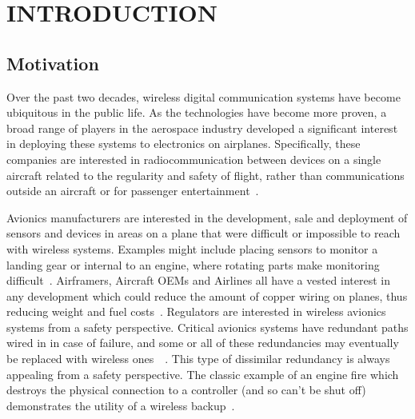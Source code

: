 %
%
%
%



\pagestyle{plain} %
\setcounter{page}{1}


\chapter{\uppercase {Introduction}}


\section{Motivation}

Over the past two decades, wireless digital communication systems have become ubiquitous in the public life. As the technologies have become more proven, a broad range of players in the aerospace industry developed a significant interest in deploying these systems to electronics on airplanes. Specifically, these companies are interested in radiocommunication between devices on a single aircraft related to the regularity and safety of flight, rather than communications outside an aircraft or for passenger entertainment~\cite{redman_waic_2011}. 

Avionics manufacturers are interested in the development, sale and deployment of sensors and devices in areas on a plane that were difficult or impossible to reach with wireless systems.  Examples might include placing sensors to monitor a landing gear or internal to an engine, where rotating parts make monitoring difficult~\cite{redman_waic_2011}. Airframers, Aircraft OEMs and Airlines all have a vested interest in any development which could reduce the amount of copper wiring on planes, thus reducing weight and fuel costs~\cite{canaday_war_2017}. Regulators are interested in wireless avionics systems from a safety perspective. Critical avionics systems have redundant paths wired in in case of failure, and some or all of these redundancies may eventually be replaced  with wireless ones~\cite{canaday_war_2017}~\cite{redman_waic_2011}. This type of dissimilar redundancy is always appealing from a safety perspective. The classic example of an engine fire which destroys the physical connection to a controller (and so can't be shut off) demonstrates the utility of a wireless backup~\cite{redman_waic_2011}.

